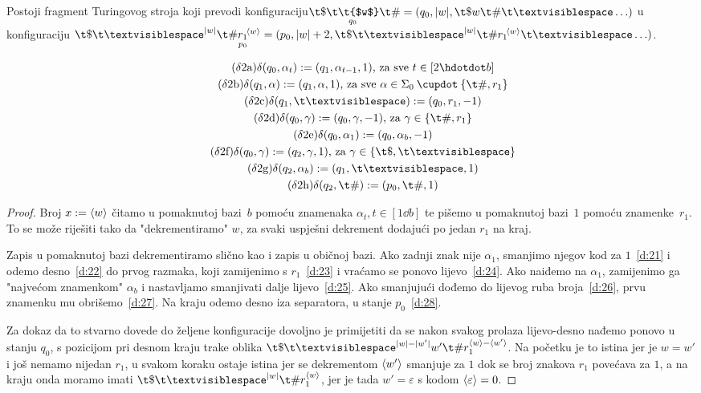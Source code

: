 \begin{lema}[{name=[drugi fragment transpiliranog stroja]}]\label{lm:faza2}
Postoji fragment Turingovog stroja koji prevodi konfiguraciju\newline $\T{\$}{q_0}{\t{$w$}}{\#}=(q_0,\dulj w,\t\$w\t\#\bl\ldots)$ u konfiguraciju $\t\$\bl^{\dulj w}\t\#\underset{\mathclap{p_0}}{r_1}^{\!\kr w}=(p_0,\dulj w+2,\t\$\bl^{\dulj w}\t\#r_1{}^{\!\kr w}\bl\ldots)$.
\end{lema}
\vspace{-1em}
\noindent\begin{gather*}
    \label{d:21}\tag{$\delta$2a}\delta(q_0,\alpha_t):=(q_1,\alpha_{t-1},1)\text{, za sve }t\in[2\dd b]\\
\label{d:22}\tag{$\delta$2b}\delta(q_1,\alpha):=(q_1,\alpha,1)\text{, za sve }\alpha\in\Sigma_0\mathbin{\dcup}\{\t\#,r_1\}\\
\label{d:23}\tag{$\delta$2c}\delta(q_1,\bl):=(q_0,r_1,-1)\\
\label{d:24}\tag{$\delta$2d}\delta(q_0,\gamma):=(q_0,\gamma,-1)\text{, za }\gamma\in\{\t\#,r_1\}\\
    \label{d:25}\tag{$\delta$2e}\delta(q_0,\alpha_1):=(q_0,\alpha_b,-1)\\
\label{d:26}\tag{$\delta$2f}\delta(q_0,\gamma):=(q_2,\gamma,1)\text{, za }\gamma\in\{\t\$,\bl\}\\
\label{d:27}\tag{$\delta$2g}\delta(q_2,\alpha_b):=(q_1,\bl,1)\\
\label{d:28}\tag{$\delta$2h}\delta(q_2,\t\#):=(p_0,\t\#,1)
\end{gather*}
\begin{proof}
Broj $x:=\langle w\rangle$ čitamo u pomaknutoj bazi~$b$ pomoću znamenaka $\alpha_t,t\in[1\dd b]$ te pišemo u pomaknutoj bazi~$1$ pomoću znamenke~$r_1$. To se može riješiti tako da "dekrementiramo" $w$, za svaki uspješni dekrement dodajući po jedan $r_1$ na kraj.

Zapis u pomaknutoj bazi dekrementiramo slično kao i zapis u običnoj bazi. Ako zadnji znak nije $\alpha_1$, smanjimo njegov kod za $1$~\eqref{d:21} i odemo desno~\eqref{d:22} do prvog razmaka, koji zamijenimo s $r_1$~\eqref{d:23} i vraćamo se ponovo lijevo~\eqref{d:24}. Ako naiđemo na $\alpha_1$, zamijenimo ga "najvećom znamenkom" $\alpha_b$ i nastavljamo smanjivati dalje lijevo~\eqref{d:25}. Ako smanjujući dođemo do lijevog ruba broja~\eqref{d:26}, prvu znamenku mu obrišemo~\eqref{d:27}. %
Na kraju odemo desno iza separatora, u stanje $p_0$~\eqref{d:28}.

Za dokaz da to stvarno dovede do željene konfiguracije dovoljno je primijetiti da se nakon svakog prolaza lijevo-desno  nađemo ponovo u stanju $q_0$, s pozicijom pri desnom kraju trake oblika $\t\$\bl^{\dulj w-\dulj{w'}}w'\t\#r_1^{\kr w-\kr{w'}}$. Na početku je to istina jer je $w=w'$ i još nemamo nijedan $r_1$, u svakom koraku ostaje istina jer se dekrementom $\langle w'\rangle$ smanjuje za $1$ dok se broj znakova $r_1$ povećava za $1$, a na kraju onda moramo imati $\t\$\bl^{\dulj w}\t\#r_1^{\kr w}$, jer je tada $w'=\varepsilon$ s kodom $\langle\varepsilon\rangle=0$.
\end{proof}


